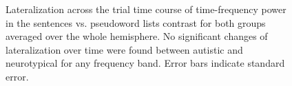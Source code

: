\begin{figure}[!ht]
	\centering
	\caption{Lateralization across the trial time course of time-frequency power in the sentences vs. pseudoword lists contrast for both groups averaged over the whole hemisphere. No significant changes of lateralization over time were found between autistic and neurotypical for any frequency band. Error bars indicate standard error. }
    \vspace*{-10pt}
	\label{fig:laterality-dynamics-wholehem}
\end{figure}



